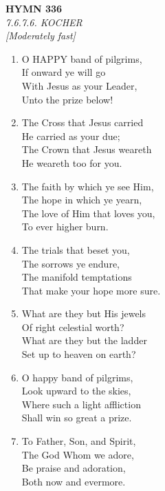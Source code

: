 \documentclass[11pt,a4paper]{article}
\begin{document}
\newpage
\begin{center}
    {\Large \textbf{HYMN 336}}
    \\
    \textit{7.6.7.6. KOCHER}
    \\
    \textit{\small [Moderately fast]}
\end{center}
\vspace{1em}

\begin{enumerate}
    \item O HAPPY band of pilgrims, \\
        If onward ye will go \\
        With Jesus as your Leader, \\
        Unto the prize below!

    \item The Cross that Jesus carried \\
        He carried as your due; \\
        The Crown that Jesus weareth \\
        He weareth too for you.

    \item The faith by which ye see Him, \\
        The hope in which ye yearn, \\
        The love of Him that loves you, \\
        To ever higher burn.

    \item The trials that beset you, \\
        The sorrows ye endure, \\
        The manifold temptations \\
        That make your hope more sure.

    \item What are they but His jewels \\
        Of right celestial worth? \\
        What are they but the ladder \\
        Set up to heaven on earth?

    \item O happy band of pilgrims, \\
        Look upward to the skies, \\
        Where such a light affliction \\
        Shall win so great a prize.

    \item To Father, Son, and Spirit, \\
        The God Whom we adore, \\
        Be praise and adoration, \\
        Both now and evermore.

\end{enumerate}
\end{document}
